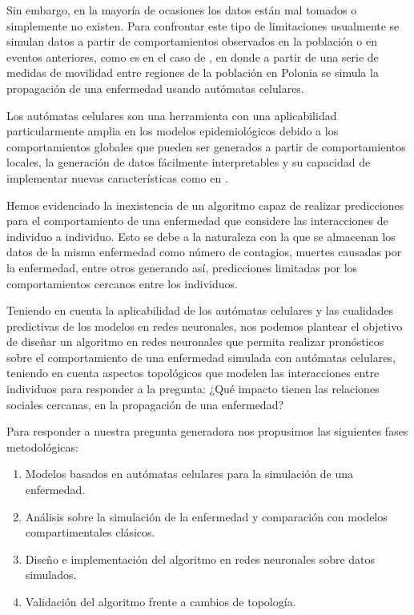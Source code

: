 Sin embargo, en la mayoría de ocasiones los datos están mal tomados o simplemente no existen. Para confrontar este tipo de limitaciones usualmente se simulan datos a partir de comportamientos observados en la población o en eventos anteriores, como es en el caso de \cite{populationDensity}, en donde a partir de una serie de medidas de movilidad entre regiones de la población en Polonia se simula la propagación de una enfermedad usando autómatas celulares.

Los autómatas celulares son una herramienta con una aplicabilidad particularmente amplia en los modelos epidemiológicos debido a los comportamientos globales que pueden ser generados a partir de comportamientos locales, la generación de datos fácilmente interpretables y su capacidad de implementar nuevas características como en \cite{spatialDependences, populationDensity, globalStochastic}.

Hemos evidenciado la inexistencia de un algoritmo capaz de realizar predicciones para el comportamiento de una enfermedad que considere las interacciones de individuo a individuo. Esto se debe a la naturaleza con la que se almacenan los datos de la misma enfermedad como número de contagios, muertes causadas por la enfermedad, entre otros generando así, predicciones limitadas por los comportamientos cercanos entre los individuos. 

Teniendo en cuenta la aplicabilidad de los autómatas celulares y las cualidades predictivas de los modelos en redes neuronales, nos podemos plantear el objetivo de diseñar un algoritmo en redes neuronales que permita realizar pronósticos sobre el comportamiento de una enfermedad simulada con autómatas celulares, teniendo en cuenta aspectos topológicos que modelen las interacciones entre individuos para responder a la pregunta: ¿Qué impacto tienen las relaciones sociales cercanas, en la propagación de una enfermedad?

Para responder a nuestra pregunta generadora nos propusimos las siguientes fases metodológicas:
\begin{enumerate}
    \item Modelos basados en autómatas celulares para la simulación de una enfermedad.
    \item Análisis sobre la simulación de la enfermedad y comparación con modelos compartimentales clásicos.
    \item Diseño e implementación del algoritmo en redes neuronales sobre datos simulados.
    \item Validación del algoritmo frente a cambios de topología.
\end{enumerate}

